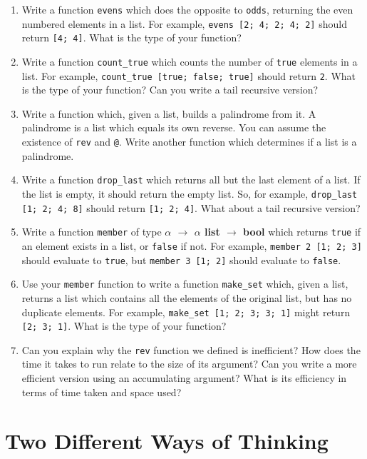 \documentclass[]{book}
\begin{document}
\begin{enumerate}
  \item Write a function \texttt{evens} which does the opposite to \texttt{odds}, returning the even numbered elements in a list. For example, \texttt{evens [2; 4; 2; 4; 2]} should return \texttt{[4; 4]}. What is the type of your function?
  \item Write a function \texttt{count\_true} which counts the number of \texttt{true} elements in a list. For example, \texttt{count\_true [true; false; true]} should return \texttt{2}. What is the type of your function? Can you write a tail recursive version?
  \item Write a function which, given a list, builds a palindrome from it. A palindrome is a list which equals its own reverse. You can assume the existence of \texttt{rev} and \texttt{@}. Write another function which determines if a list is a palindrome.
  \item Write a function \texttt{drop\_last} which returns all but the last element of a list. If the list is empty, it should return the empty list. So, for example, \texttt{drop\_last [1; 2; 4; 8]} should return \texttt{[1; 2; 4]}. What about a tail recursive version?
  \item Write a function \texttt{member} of type \textbf{\textsf {$\alpha$ $\rightarrow$ $\alpha$ list $\rightarrow$ bool}} which returns \texttt{true} if an element exists in a list, or \texttt{false} if not. For example, \texttt{member 2 [1; 2; 3]} should evaluate to \texttt{true}, but \texttt{member 3 [1; 2]} should evaluate to \texttt{false}. 
  \item Use your \texttt{member} function to write a function \texttt{make\_set} which, given a list, returns a list which contains all the elements of the original list, but has no duplicate elements. For example, \texttt{make\_set [1; 2; 3; 3; 1]} might return \texttt{[2; 3; 1]}. What is the type of your function?
  \item Can you explain why the \texttt{rev} function we defined is inefficient? How does the time it takes to run relate to the size of its argument? Can you write a more efficient version using an accumulating argument? What is its efficiency in terms of time taken and space used?
\end{enumerate}

\cleardoublepage
\thispagestyle{empty}

\pagestyle{empty}

\chapter*{Two Different Ways of Thinking}
\end{document}
